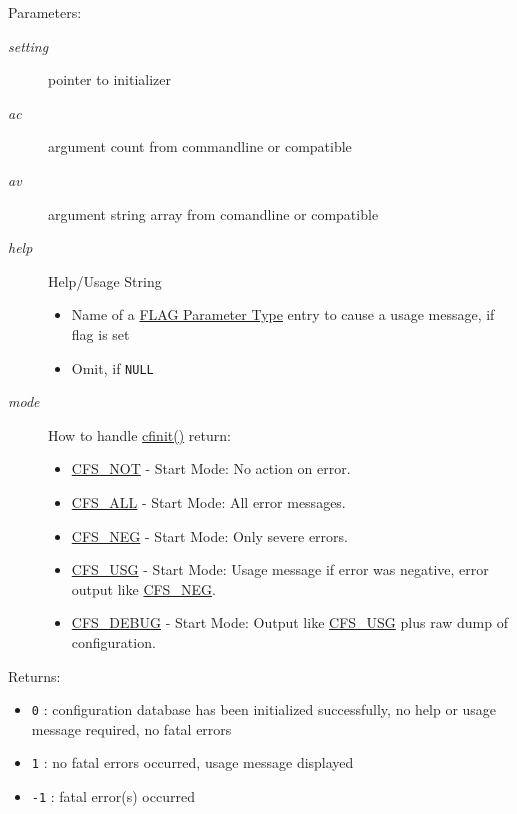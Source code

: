 \begin{Desc}
\item[Parameters:]
\begin{description}
\item[{\em setting}]pointer to initializer\item[{\em ac}]argument count from commandline or compatible\item[{\em av}]argument string array from comandline or compatible\item[{\em help}]Help/Usage String\begin{itemize}
\item Name of a \hyperlink{parameter_types_parameter_type_flag}{FLAG Parameter Type} entry to cause a usage message, if flag is set\item Omit, if {\tt NULL} \end{itemize}
\item[{\em mode}]How to handle \hyperlink{group__cflib__core_ge593ff607f853bd5fc16a16bb6759314}{cfinit()} return: \begin{itemize}
\item \hyperlink{group__cflib__core_gf363125c0f5c520d748d8d0ecaf1af01}{CFS\_\-NOT} - Start Mode: No action on error.  \item \hyperlink{group__cflib__core_g50bc281400629cfb20e899144d59a3b7}{CFS\_\-ALL} - Start Mode: All error messages.  \item \hyperlink{group__cflib__core_g5663cfeeda02fa9e2fee53b418c5045b}{CFS\_\-NEG} - Start Mode: Only severe errors.  \item \hyperlink{group__cflib__core_g3f535ad957f1836dea64deae798324a5}{CFS\_\-USG} - Start Mode: Usage message if error was negative, error output like \hyperlink{group__cflib__core_g5663cfeeda02fa9e2fee53b418c5045b}{CFS\_\-NEG}.  \item \hyperlink{group__cflib__core_g870957fdc2246ddc767747f8dd645bdf}{CFS\_\-DEBUG} - Start Mode: Output like \hyperlink{group__cflib__core_g3f535ad957f1836dea64deae798324a5}{CFS\_\-USG} plus raw dump of configuration. \end{itemize}
\end{description}
\end{Desc}
\begin{Desc}
\item[Returns:]\begin{itemize}
\item {\tt 0} : configuration database has been initialized successfully, no help or usage message required, no fatal errors \item {\tt 1} : no fatal errors occurred, usage message displayed \item {\tt -1} : fatal error(s) occurred \end{itemize}
\end{Desc}
